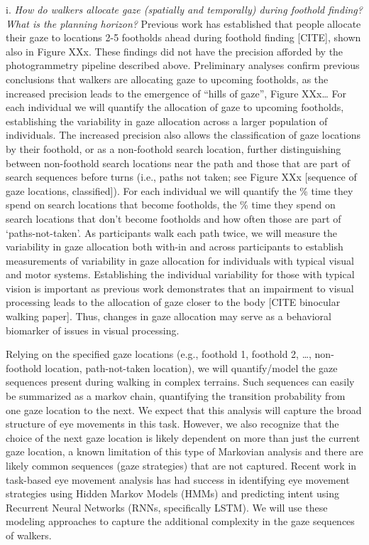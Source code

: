 i. \emph{How do walkers allocate gaze (spatially and temporally) during foothold finding? What is the planning horizon?} Previous work has established that people allocate their gaze to locations 2-5 footholds ahead during foothold finding [CITE], shown also in Figure XXx. These findings did not have the precision afforded by the photogrammetry pipeline described above. Preliminary analyses confirm previous conclusions that walkers are allocating gaze to upcoming footholds, as the increased precision leads to the emergence of ``hills of gaze'',
Figure XXx\ldots{} For each individual we will quantify the allocation of gaze to upcoming footholds, establishing the variability in gaze allocation across a larger population of individuals. The increased precision also allows the classification of gaze locations by their
foothold, or as a non-foothold search location, further distinguishing between non-foothold search locations near the path and those that are part of search sequences before turns (i.e., paths not taken; see Figure XXx [sequence of gaze locations, classified]). For each individual we will quantify the \% time they spend on search locations that become
footholds, the \% time they spend on search locations that don't become footholds and how often those are part of `paths-not-taken'. As participants walk each path twice, we will measure the variability in gaze allocation both with-in and across participants to establish measurements of variability in gaze allocation for individuals with typical visual and motor systems. Establishing the individual variability for those with typical vision is important as previous work demonstrates that an impairment to visual processing leads to the allocation of gaze closer to the body [CITE binocular walking paper]. Thus, changes in gaze allocation may serve as a behavioral biomarker of issues in visual processing.

Relying on the specified gaze locations (e.g., foothold 1, foothold 2, \ldots, non-foothold location, path-not-taken location), we will quantify/model the gaze sequences present during walking in complex terrains. Such sequences can easily be summarized as a markov chain, quantifying the transition probability from one gaze location to the next. We expect that this analysis will capture the broad structure of eye movements in this task. However, we also recognize that the choice of the next gaze location is likely dependent on more than just the current gaze location, a known limitation of this type of Markovian analysis and there are likely common sequences (gaze strategies) that are not captured. Recent work in task-based eye movement analysis has had success in identifying eye movement strategies using Hidden Markov Models (HMMs) and predicting intent using Recurrent Neural Networks (RNNs, specifically LSTM). We will use these modeling approaches to capture the additional complexity in the gaze sequences of walkers.

